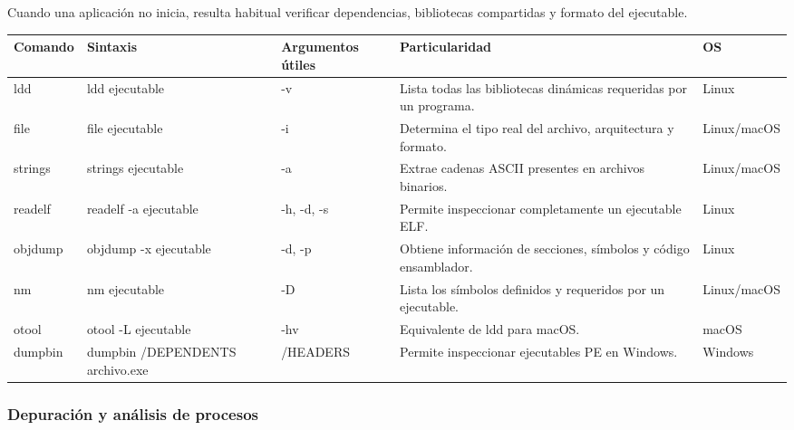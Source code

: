 \documentclass[a4paper,10pt]{article}
\begin{document}
Cuando una aplicación no inicia, resulta habitual verificar dependencias,
bibliotecas compartidas y formato del ejecutable.

\begin{longtable}{|p{2.8cm}|p{3.3cm}|p{4cm}|p{5.3cm}|p{1.5cm}|}

\hline
Comando &
Sintaxis &
Argumentos útiles &
Particularidad &
OS
\\
\hline
\endhead

ldd &
ldd ejecutable &
-v &
Lista todas las bibliotecas dinámicas requeridas por un programa.
&
Linux
\\
\hline

file &
file ejecutable &
-i &
Determina el tipo real del archivo, arquitectura y formato.
&
Linux/macOS
\\
\hline

strings &
strings ejecutable &
-a &
Extrae cadenas ASCII presentes en archivos binarios.
&
Linux/macOS
\\
\hline

readelf &
readelf -a ejecutable &
-h, -d, -s &
Permite inspeccionar completamente un ejecutable ELF.
&
Linux
\\
\hline

objdump &
objdump -x ejecutable &
-d, -p &
Obtiene información de secciones, símbolos y código ensamblador.
&
Linux
\\
\hline

nm &
nm ejecutable &
-D &
Lista los símbolos definidos y requeridos por un ejecutable.
&
Linux/macOS
\\
\hline

otool &
otool -L ejecutable &
-hv &
Equivalente de ldd para macOS.
&
macOS
\\
\hline

dumpbin &
dumpbin /DEPENDENTS archivo.exe &
/HEADERS &
Permite inspeccionar ejecutables PE en Windows.
&
Windows
\\
\hline

\end{longtable}


\subsubsection{Depuración y análisis de procesos}
\end{document}
